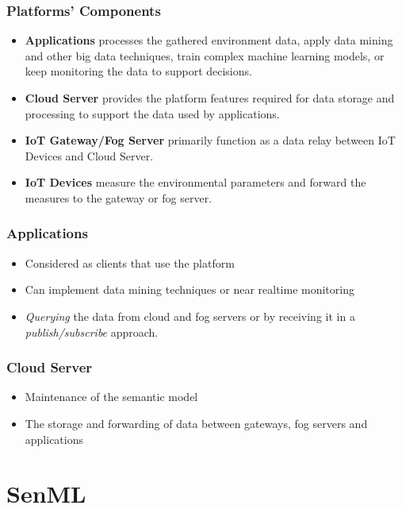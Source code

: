 \documentclass{../iot-lecture}
\begin{document}
\begin{frame}
  \frametitle{Platforms' Components}
  \begin{itemize}
    \item \textbf{\color{Cyan} Applications} processes the gathered environment data, apply data mining and other big data
      techniques, train complex machine learning models, or keep monitoring the data to support decisions.
    \item \textbf{\color{YellowOrange} Cloud Server} provides the platform features required for data storage and processing to support
      the data used by applications.
    \item \textbf{\color{LimeGreen} IoT Gateway/Fog Server} primarily function as a data relay between IoT Devices and Cloud Server.
    \item \textbf{\color{RubineRed} IoT Devices} measure the environmental parameters and forward the measures to the gateway or fog server.
  \end{itemize}
\end{frame}

\begin{frame}
  \frametitle{Applications}
  \begin{itemize}
    \item Considered as clients that use the platform
    \item Can implement data mining techniques or near realtime monitoring
    \item \textit{Querying} the data from cloud and fog servers or by receiving it in a \textit{publish/subscribe} approach.
  \end{itemize}
\end{frame}

\begin{frame}
  \frametitle{Cloud Server}
  \begin{itemize}
    \item Maintenance of the semantic model
    \item The storage and forwarding of data between gateways, fog servers and applications
  \end{itemize}
\end{frame}

\section{SenML}
\end{document}
